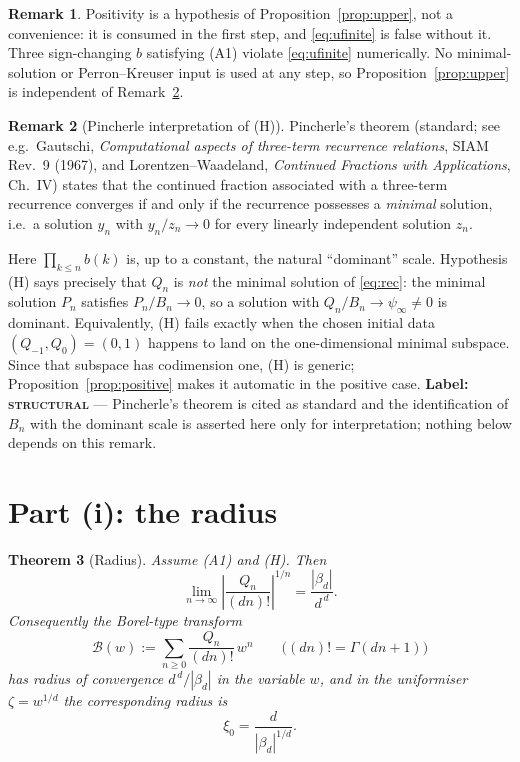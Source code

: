 \documentclass[11pt]{article}
\newtheorem{theorem}{Theorem}
\theoremstyle{definition}
\newtheorem{remark}[theorem]{Remark}
\newcommand{\bd}{\beta_d}
\newcommand{\psiinf}{\psi_\infty}
\begin{document}
\begin{remark}\label{rem:upper-positivity}
Positivity is a hypothesis of Proposition~\ref{prop:upper}, not a convenience:
it is consumed in the first step, and \eqref{eq:ufinite} is false without it.
Three sign-changing $b$ satisfying \textup{(A1)} violate \eqref{eq:ufinite}
numerically. No minimal-solution or Perron--Kreuser input is used at any step,
so Proposition~\ref{prop:upper} is independent of Remark~\ref{rem:pincherle}.
\end{remark}

\begin{remark}[Pincherle interpretation of (H)]\label{rem:pincherle}
Pincherle's theorem (standard; see e.g.\ Gautschi, \emph{Computational aspects
of three-term recurrence relations}, SIAM Rev.\ 9 (1967), and Lorentzen--Waadeland,
\emph{Continued Fractions with Applications}, Ch.~IV) states that the continued
fraction associated with a three-term recurrence converges if and only if the
recurrence possesses a \emph{minimal} solution, i.e.\ a solution $y_n$ with
$y_n/z_n\to0$ for every linearly independent solution $z_n$.

Here $\prod_{k\le n}b(k)$ is, up to a constant, the natural ``dominant'' scale.
Hypothesis (H) says precisely that $Q_n$ is \emph{not} the minimal solution of
\eqref{eq:rec}: the minimal solution $P_n$ satisfies $P_n/B_n\to0$, so a
solution with $Q_n/B_n\to\psiinf\neq0$ is dominant. Equivalently, (H) fails exactly
when the chosen initial data $(Q_{-1},Q_0)=(0,1)$ happens to land on the
one-dimensional minimal subspace. Since that subspace has codimension one, (H) is
generic; Proposition~\ref{prop:positive} makes it automatic in the positive case.
\textbf{Label: \textsc{structural}} --- Pincherle's theorem is cited as standard
and the identification of $B_n$ with the dominant scale is asserted here only for
interpretation; nothing below depends on this remark.
\end{remark}

\section{Part (i): the radius}

\begin{theorem}[Radius]\label{thm:radius}
Assume \textup{(A1)} and \textup{(H)}. Then
\begin{equation}\label{eq:radius}
\lim_{n\to\infty}\left|\frac{Q_n}{(dn)!}\right|^{1/n}=\frac{|\bd|}{d^{\,d}} .
\end{equation}
Consequently the Borel-type transform
\begin{equation}\label{eq:borel}
\mathcal{B}(w):=\sum_{n\ge0}\frac{Q_n}{(dn)!}\,w^n
\qquad\bigl((dn)!=\Gamma(dn+1)\bigr)
\end{equation}
has radius of convergence $d^{\,d}/|\bd|$ in the variable $w$, and in the
uniformiser $\zeta=w^{1/d}$ the corresponding radius is
\begin{equation}\label{eq:xi0}
\xi_0=\frac{d}{|\bd|^{1/d}} .
\end{equation}
\end{theorem}
\end{document}
